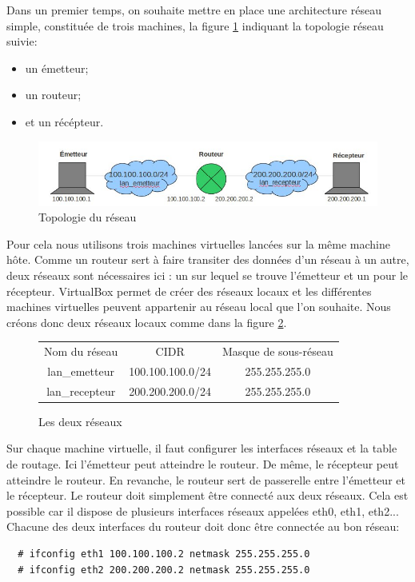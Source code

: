 \documentclass[a4paper]{article}
\begin{document}
Dans un premier temps, on souhaite mettre en place une
architecture réseau simple, constituée de trois machines, la
figure \ref{topo} indiquant la topologie réseau suivie:
\begin{itemize}
	\item un émetteur;
	\item un routeur;
	\item et un récépteur.
\end{itemize}

\begin{figure}[!ht]
	\centering
	\includegraphics[scale=.5]{topo.jpg}
	\caption{\label{topo} Topologie du réseau}
\end{figure}

Pour cela nous utilisons trois machines virtuelles lancées sur la même machine hôte. 
Comme un routeur sert à faire transiter des données d'un réseau à un autre, deux
réseaux sont nécessaires ici : un sur lequel se trouve l'émetteur et un pour le récepteur.
VirtualBox permet de créer des réseaux locaux et les différentes machines virtuelles
 peuvent appartenir au réseau local que l’on souhaite. Nous créons donc deux réseaux locaux 
 comme dans la figure \ref{reseaux1}.

\begin{figure}
	\centering
	\begin{tabular}{c|c|c}
	Nom du réseau & CIDR & Masque de sous-réseau\\
	lan\_emetteur & 100.100.100.0/24 & 255.255.255.0\\
	lan\_recepteur & 200.200.200.0/24 & 255.255.255.0\\
	\end{tabular}
	\caption{\label{reseaux1} Les deux réseaux}
\end{figure}

Sur chaque machine virtuelle, il faut configurer les interfaces réseaux et la table de routage. 
Ici l'émetteur peut atteindre le routeur. De même, le récepteur peut atteindre le routeur. 
En revanche, le routeur sert de passerelle entre l'émetteur et le récepteur.
Le routeur doit simplement être connecté aux deux réseaux.
Cela est possible car il dispose de plusieurs interfaces réseaux appelées eth0, eth1, eth2...
Chacune des deux interfaces du routeur doit donc être
connectée au bon réseau:
\begin{verbatim}
  # ifconfig eth1 100.100.100.2 netmask 255.255.255.0
  # ifconfig eth2 200.200.200.2 netmask 255.255.255.0
\end{verbatim}
\end{document}
